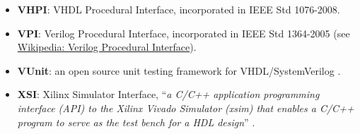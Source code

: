 \documentclass[
]{article}
\providecommand{\tightlist}{%
  \setlength{\itemsep}{0pt}\setlength{\parskip}{0pt}}
\begin{document}
\begin{itemize}
  \begin{itemize}
  \tightlist
  \item
    Revisions: \href{https://ieeexplore.ieee.org/document/26487}{1987}, \href{https://ieeexplore.ieee.org/document/392561}{1993}, \href{https://ieeexplore.ieee.org/document/893288}{2000}, \href{https://ieeexplore.ieee.org/document/1003477}{2002} (IEC 61691-1-1:2004), \href{https://ieeexplore.ieee.org/document/4772740}{2008} (IEC 61691-1-1:2011), \href{https://ieeexplore.ieee.org/document/8938196}{2019}.
  \item
    Related standards:

    \begin{itemize}
    \tightlist
    \item
      1076.1 VHDL Analog and Mixed-Signal (VHDL-AMS)
    \item
      1076.1.1 VHDL-AMS Standard Packages (stdpkgs)
    \item
      1076.2 VHDL Math Package
    \item
      1076.3 VHDL Synthesis Package (vhdlsynth) (numeric\_std)
    \item
      1076.3 VHDL Synthesis Package -- Floating Point (fphdl)
    \item
      1076.4 Timing (VHDL Initiative Towards ASIC Libraries: vital)
    \item
      1076.6 VHDL Synthesis Interoperability (withdrawn in 2010){[}11{]}
    \item
      1164 VHDL Multivalue Logic (std\_logic\_1164) Packages
    \end{itemize}
  \end{itemize}
\item
  \textbf{VHPI}: VHDL Procedural Interface, incorporated in IEEE Std 1076-2008.
\item
  \textbf{VPI}: Verilog Procedural Interface, incorporated in IEEE Std 1364-2005 (see \href{https://en.wikipedia.org/wiki/Verilog_Procedural_Interface}{Wikipedia: Verilog Procedural Interface}).
\item
  \textbf{VUnit}: an open source unit testing framework for VHDL/SystemVerilog \autocite{vunit}.
\item
  \textbf{XSI}: Xilinx Simulator Interface, ``\emph{a C/C++ application programming interface (API) to the Xilinx Vivado Simulator (xsim) that enables a C/C++ program to serve as the test bench for a HDL design}'' \autocite{xsi}.
\end{itemize}

\printbibliography
\end{document}
